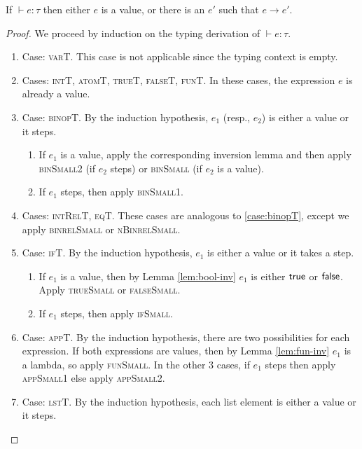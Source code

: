 \documentclass{homework}
\begin{document}
\begin{thm}[Progress]
  If $\vdash e : \tau$ then either $e$ is a value, or there is an $e'$ such that $e \to e'$.
\end{thm}
\begin{proof}
  We proceed by induction on the typing derivation of $\vdash e : \tau$.
  \begin{enumerate}
  \item Case: \textsc{varT}.
    This case is not applicable since the typing context is empty.
  \item Cases: \textsc{intT}, \textsc{atomT}, \textsc{trueT}, \textsc{falseT}, \textsc{funT}.
    In these cases, the expression $e$ is already a value.
  \item\label{case:binopT} Case: \textsc{binopT}.
    By the induction hypothesis, $e_{1}$ (resp., $e_{2}$) is either a value or it steps.
    \begin{enumerate}
    \item If $e_{1}$ is a value, apply the corresponding inversion lemma and then apply \textsc{binSmall2} (if $e_{2}$ steps) or \textsc{binSmall} (if $e_{2}$ is a value).
    \item If $e_{1}$ steps, then apply \textsc{binSmall1}.
    \end{enumerate}
  \item Cases: \textsc{intRelT}, \textsc{eqT}.
    These cases are analogous to \ref{case:binopT}, except we apply \textsc{binrelSmall} or \textsc{nBinrelSmall}.
  \item Case: \textsc{ifT}.
    By the induction hypothesis, $e_{1}$ is either a value or it takes a step.
    \begin{enumerate}
    \item If $e_{1}$ is a value, then by Lemma \ref{lem:bool-inv} $e_{1}$ is either $\textsf{true}$ or $\textsf{false}$.
      Apply \textsc{trueSmall} or \textsc{falseSmall}.
    \item If $e_{1}$ steps, then apply \textsc{ifSmall}.
    \end{enumerate}
  \item Case: \textsc{appT}.
    By the induction hypothesis, there are two possibilities for each expression.
    If both expressions are values, then by Lemma \ref{lem:fun-inv} $e_{1}$ is a lambda, so apply \textsc{funSmall}.
    In the other 3 cases, if $e_{1}$ steps then apply \textsc{appSmall1} else apply \textsc{appSmall2}.
  \item Case: \textsc{lstT}.
    By the induction hypothesis, each list element is either a value or it steps.

\end{enumerate}
\end{proof}
\end{document}
